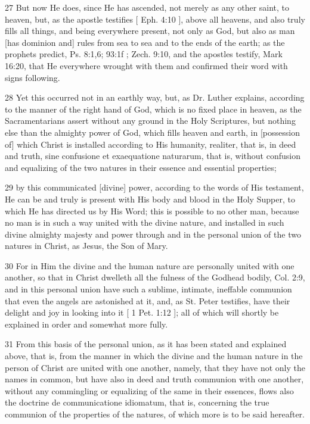 {27 But now He does, since He has ascended, not merely as any other saint, to heaven, but, as the apostle testifies [ Eph. 4:10 ], above all heavens, and also truly fills all things, and being everywhere present, not only as God, but also as man [has dominion and] rules from sea to sea and to the ends of the earth; as the prophets predict, Ps. 8:1,6; 93:1f ; Zech. 9:10, and the apostles testify, Mark 16:20, that He everywhere wrought with them and confirmed their word with signs following.

28 Yet this occurred not in an earthly way, but, as Dr. Luther explains, according to the manner of the right hand of God, which is no fixed place in heaven, as the Sacramentarians assert without any ground in the Holy Scriptures, but nothing else than the almighty power of God, which fills heaven and earth, in [possession of] which Christ is installed according to His humanity, realiter, that is, in deed and truth, sine confusione et exaequatione naturarum, that is, without confusion and equalizing of the two natures in their essence and essential properties;

29 by this communicated [divine] power, according to the words of His testament, He can be and truly is present with His body and blood in the Holy Supper, to which He has directed us by His Word; this is possible to no other man, because no man is in such a way united with the divine nature, and installed in such divine almighty majesty and power through and in the personal union of the two natures in Christ, as Jesus, the Son of Mary.

30 For in Him the divine and the human nature are personally united with one another, so that in Christ dwelleth all the fulness of the Godhead bodily, Col. 2:9, and in this personal union have such a sublime, intimate, ineffable communion that even the angels are astonished at it, and, as St. Peter testifies, have their delight and joy in looking into it [ 1 Pet. 1:12 ]; all of which will shortly be explained in order and somewhat more fully.

31 From this basis of the personal union, as it has been stated and explained above, that is, from the manner in which the divine and the human nature in the person of Christ are united with one another, namely, that they have not only the names in common, but have also in deed and truth communion with one another, without any commingling or equalizing of the same in their essences, flows also the doctrine de communicatione idiomatum, that is, concerning the true communion of the properties of the natures, of which more is to be said hereafter.

}
